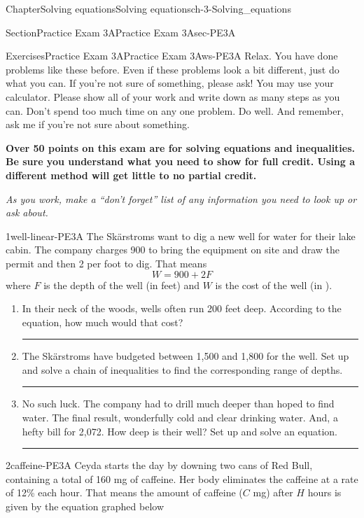 \documentclass[twoside,11pt,]{book}
\newcommand{\terminology}[1]{\textbf{#1}}
\newlength{\workspacestrutwidth}
\numberwithin{equation}{section}
\begin{document}
\begin{chapterptx}{Chapter}{Solving equations}{}{Solving equations}{}{}{ch-3-Solving_equations}
\begin{sectionptx}{Section}{Practice Exam 3A}{}{Practice Exam 3A}{}{}{sec-PE3A}
\begin{exercises-subsection-numberless}{Exercises}{Practice Exam 3A}{}{Practice Exam 3A}{}{}{ws-PE3A}
Relax. You have done problems like these before. Even if these problems look a bit different, just do what you can. If you're not sure of something, please ask! You may use your calculator. Please show all of your work and write down as many steps as you can. Don't spend too much time on any one problem. Do well. And remember, ask me if you're not sure about something.%
 \par
\terminology{Over 50 points on this exam are for solving equations and inequalities. Be sure you understand what you need to show for full credit. Using a different method will get little to no partial credit.}%
 \par
\emph{As you work, make a ``don't forget'' list of any information you need to look up or ask about.}%
 \begin{divisionexercise}{1}{}{}{well-linear-PE3A}%
The Skärstroms want to dig a new well for water for their lake cabin. The company charges \textdollar{}900 to bring the equipment on site and draw the permit and then \textdollar{}2 per foot to dig. That means%
\begin{equation*}
W=900+2F
\end{equation*}
where \(F\) is the depth of the well (in feet) and \(W\) is the cost of the well (in \textdollar{}).%
\begin{enumerate}[label=(\alph*),ref=\alph*]%
\item{}In their neck of the woods, wells often run 200 feet deep. According to the equation, how much would that cost?%
\par\rule{\workspacestrutwidth}{0.5in}%
\item{}The Skärstroms have budgeted between \textdollar{}1,500 and \textdollar{}1,800 for the well. Set up and solve a chain of inequalities to find the corresponding range of depths.%
\par\rule{\workspacestrutwidth}{1in}%
\item{}No such luck. The company had to drill much deeper than hoped to find water. The final result, wonderfully cold and clear drinking water. And, a hefty bill for \textdollar{}2,072. How deep is their well? Set up and solve an equation.%
\par\rule{\workspacestrutwidth}{0.5in}%
\end{enumerate}%
\end{divisionexercise}%
\clearpage
\begin{divisionexercise}{2}{}{}{caffeine-PE3A}%
Ceyda starts the day by downing two cans of Red Bull, containing a total of 160 mg of caffeine. Her body eliminates the caffeine at a rate of 12\% each hour. That means the amount of caffeine (\(C\) mg) after \(H\) hours is given by the equation graphed below%

\end{divisionexercise}
\end{exercises-subsection-numberless}
\end{sectionptx}
\end{chapterptx}
\end{document}
